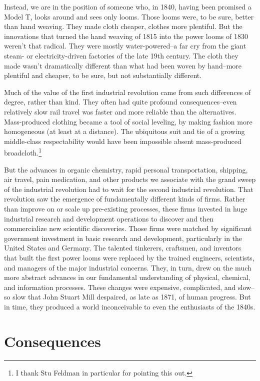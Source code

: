 \documentclass[12pt]{article}
\begin{document}
Instead, we are in the position of someone who, in 1840, having been promised a
Model T, looks around and sees only looms. Those looms were, to be
sure, better than hand weaving. They made cloth cheaper, clothes more
plentiful. But the innovations that turned the hand weaving of
1815 into the power looms of 1830 weren't that radical. They were
mostly water-powered--a far cry from the giant steam- or
electricity-driven factories of the late 19th century. The cloth they
made wasn't dramatically different than what had been woven by
hand--more plentiful and cheaper, to be sure, but not substantially
different.   

Much of the value of the first industrial revolution came from such
differences of degree, rather than kind. They often had quite profound
consequences--even relatively slow rail travel was faster and more
reliable than the alternatives. Mass-produced clothing became a tool of
social leveling, by making fashion more homogeneous (at least at a
distance). The ubiquitous suit and tie of a growing middle-class
respectability would have been impossible absent mass-produced
broadcloth.\footnote{I thank Stu Feldman in particular for pointing
  this out.} 

But the advances in organic
chemistry, rapid personal transportation, shipping, air travel, pain
medication, and other products we associate with the grand sweep of
the industrial revolution had to wait for the second industrial
revolution. That revolution saw the emergence of fundamentally
different kinds of firms. Rather than improve on or scale up pre-existing
processes, these firms invested in huge industrial research and
development operations to discover and then commercialize new
scientific discoveries. Those firms were matched by significant
government investment in basic research and development, particularly
in the United States and Germany. The talented tinkerers, craftsmen,
and inventors that built the first power looms were replaced by the
trained engineers, scientists, and managers of the major industrial
concerns. They, in turn, drew on the much more abstract
advances in our fundamental understanding of physical, chemical, and
information processes. These changes were expensive, complicated, and
slow--so slow that John Stuart Mill despaired, as late as 1871, of
human progress. But in time, they produced a world inconceivable to
even the enthusiasts of the 1840s. 


\section{Consequences}
\label{sec:consequences}
\end{document}
